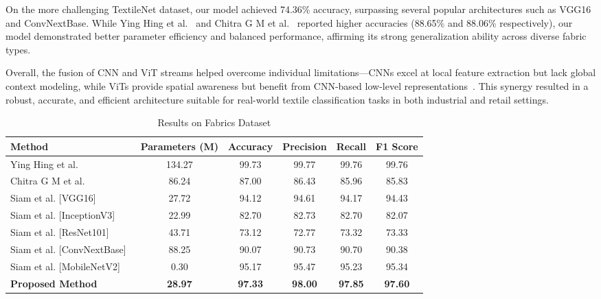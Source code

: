 On the more challenging TextileNet dataset, our model achieved 74.36\% accuracy, surpassing several popular architectures such as VGG16~\cite{simonyan2015vgg} and ConvNextBase. While Ying Hing et al.~\cite{hong2024research} and Chitra G M et al.~\cite{chitra2023fabric} reported higher accuracies (88.65\% and 88.06\% respectively), our model demonstrated better parameter efficiency and balanced performance, affirming its strong generalization ability across diverse fabric types.

Overall, the fusion of CNN and ViT streams helped overcome individual limitations—CNNs excel at local feature extraction but lack global context modeling, while ViTs provide spatial awareness but benefit from CNN-based low-level representations~\cite{dosovitskiy2020vit}. This synergy resulted in a robust, accurate, and efficient architecture suitable for real-world textile classification tasks in both industrial and retail settings.

\begin{table}[h]
\centering
\caption{Results on Fabrics Dataset}
\label{tab:rgb_results}
\begin{adjustbox}{max width=\textwidth}
\begin{tabular}{lccccc}
\toprule
\textbf{Method} & \textbf{Parameters (M)} & \textbf{Accuracy} & \textbf{Precision} & \textbf{Recall} & \textbf{F1 Score} \\
\midrule
Ying Hing et al.~\cite{hong2024research} & 134.27 & 99.73 & 99.77 & 99.76 & 99.76 \\
Chitra G M et al.~\cite{chitra2023fabric} & 86.24 & 87.00 & 86.43 & 85.96 & 85.83 \\
Siam et al. [VGG16]~\cite{siam2023textilenet} & 27.72 & 94.12 & 94.61 & 94.17 & 94.43 \\
Siam et al. [InceptionV3]~\cite{siam2023textilenet} & 22.99 & 82.70 & 82.73 & 82.70 & 82.07 \\
Siam et al. [ResNet101]~\cite{siam2023textilenet} & 43.71 & 73.12 & 72.77 & 73.32 & 73.33 \\
Siam et al. [ConvNextBase]~\cite{siam2023textilenet} & 88.25 & 90.07 & 90.73 & 90.70 & 90.38 \\
Siam et al. [MobileNetV2]~\cite{siam2023textilenet} & 0.30 & 95.17 & 95.47 & 95.23 & 95.34 \\
\textbf{Proposed Method} & \textbf{28.97} & \textbf{97.33} & \textbf{98.00} & \textbf{97.85} & \textbf{97.60} \\
\bottomrule
\end{tabular}
\end{adjustbox}
\end{table}

